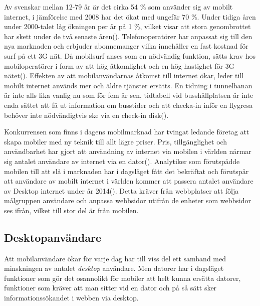 \documentclass[11pt]{article}
\begin{document}
Av svenskar mellan 12-79 år är det cirka 54 \% som använder sig av mobilt internet, i jämförelse med 2008 har det ökat med ungefär 70 \%. Under tidiga åren under 2000-talet låg ökningen per år på 1 \%, vilket visar att stora genombrottet har skett under de två senaste åren(\cite[s. 24]{.se}).  Telefonoperatörer har anpassat sig till den nya marknaden och erbjuder abonnemanger vilka innehåller en fast kostnad för surf på ett 3G nät. Då mobilsurf anses som en nödvändig funktion, sätts krav hos mobiloperatörer i form av att hög åtkomlighet och en hög hastighet för 3G nätet(\cite[s. 17]{Cfigroup_2009}). Effekten av att mobilanvändarnas åtkomst till internet ökar, leder till mobilt internet används mer och äldre tjänster ersätts. En tidning i tunnelbanan är inte alls lika vanlig nu som för fem år sen, tidtabell vid busshållplatsen är inte enda sättet att få ut information om busstider och att checka-in inför en flygresa behöver inte nödvändigtvis ske via en check-in disk(\cite{kpcb}).

\newpage
Konkurrensen som finns i dagens mobilmarknad har tvingat ledande företag att skapa mobiler med ny teknik till allt lägre priser. Pris, tillgänglighet och användbarhet har gjort att användning av internet via mobilen i världen närmar sig antalet användare av internet via en dator(\cite{morganstanley}). Analytiker som förutspådde mobilen till att slå i marknaden har i dagsläget fått det bekräftat och förutspår att användare av mobilt internet i världen kommer att passera antalet användare av Desktop internet  under år 2014(\cite{morganstanley}). Detta kräver från webbplatser att följa målgruppen användare och anpassa webbsidor utifrån de enheter som webbsidor ses ifrån, vilket till stor del är från mobilen.

\subsection{Desktopanvändare}
Att mobilanvändare ökar för varje dag har till viss del ett samband med minskningen av antalet \textit{desktop} användare. Men datorer har i dagsläget funktioner som gör det osannolikt för mobiler att helt kunna ersätta datorer, funktioner som kräver att man sitter vid en dator och på så sätt sker informationssökandet i webben via desktop. 
\end{document}
